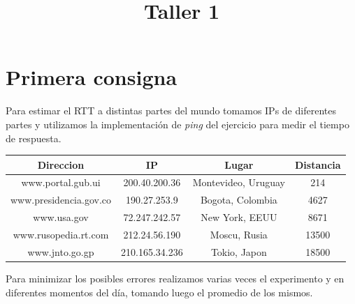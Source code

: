 \documentclass[a4paper]{article}
\title{Taller 1}
\begin{document}


\maketitle

\newpage

\tableofcontents



\newpage

\section{Primera consigna}

Para estimar el RTT a distintas partes del mundo tomamos IPs de diferentes partes y utilizamos la implementación de \textit{ping} del ejercicio para medir el tiempo de respuesta.  


\begin{table}[H]
\begin{center}
\begin{tabular}{|c|c|c|c|}
\hline
Direccion & IP & Lugar & Distancia \\
\hline
www.portal.gub.ui & 200.40.200.36 & Montevideo, Uruguay & 214 \\
\hline
www.presidencia.gov.co & 190.27.253.9 & Bogota, Colombia & 4627\\
\hline
www.usa.gov & 72.247.242.57 & New York, EEUU & 8671\\
\hline
www.rusopedia.rt.com & 212.24.56.190 & Moscu, Rusia & 13500 \\
\hline
www.jnto.go.gp & 210.165.34.236 & Tokio, Japon  & 18500\\
\hline
\end{tabular}

\end{center}
\end{table}

Para minimizar los posibles errores realizamos varias veces el experimento y en diferentes momentos del día, tomando luego el promedio de los mismos. \\
\end{document}
